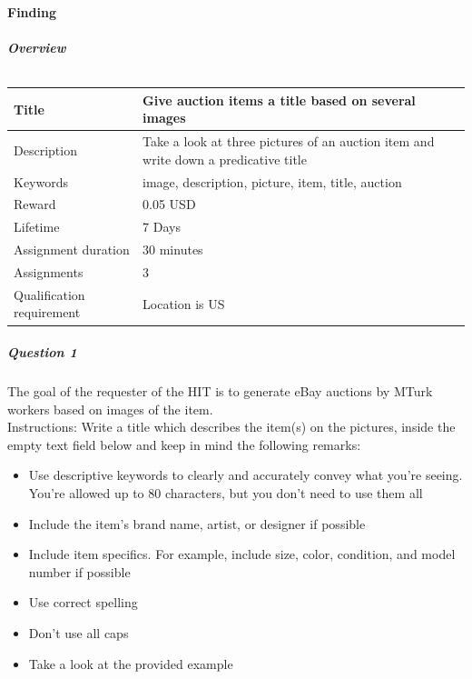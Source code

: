 \paragraph{Finding}
\subparagraph{Overview}
\begin{table}[h!]
	\begin{center}
	\begin{tabular}{| l | p{10cm} |}
		\hline
		Title & Give auction items a title based on several images \\
		\hline
		Description & Take a look at three pictures of an auction item and write down a predicative title \\
		\hline
		Keywords & image, description, picture, item, title, auction \\
		\hline
		Reward & 0.05 USD \\
		\hline
		Lifetime & 7 Days \\
		\hline
		Assignment duration & 30 minutes \\
		\hline
		Assignments & 3 \\
		\hline
		Qualification requirement & Location is US \\
		\hline
	\end{tabular}
	\end{center}
	\caption{}
\end{table}
\subparagraph{Question 1}
The goal of the requester of the HIT is to generate eBay auctions by MTurk workers based on images of the item.\\
Instructions: Write a title which describes the item(s) on the pictures, inside the empty text field below and keep in mind the following remarks:
\begin{itemize}
	\item Use descriptive keywords to clearly and accurately convey what you're seeing. You're allowed up to 80 characters, but you don't need to use them all
	\item Include the item's brand name, artist, or designer if possible
	\item Include item specifics. For example, include size, color, condition, and model number if possible
	\item Use correct spelling
	\item Don't use all caps
	\item Take a look at the provided example 
\end{itemize}
